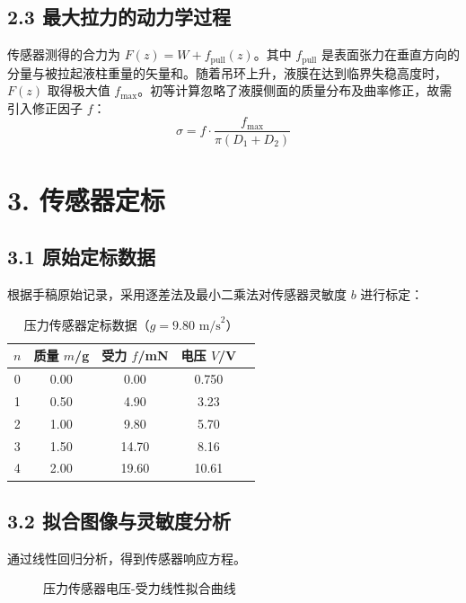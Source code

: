 \documentclass[twocolumn, 10pt, UTF8]{ctexart}
\begin{document}
	\subsection{2.3 最大拉力的动力学过程}
	传感器测得的合力为 $F(z) = W + f_{\text{pull}}(z)$。其中 $f_{\text{pull}}$ 是表面张力在垂直方向的分量与被拉起液柱重量的矢量和。随着吊环上升，液膜在达到临界失稳高度时，$F(z)$ 取得极大值 $f_{\max}$。初等计算忽略了液膜侧面的质量分布及曲率修正，故需引入修正因子 $f$：
	\begin{equation}
		\sigma = f \cdot \frac{f_{\max}}{\pi(D_1 + D_2)}
	\end{equation}
	
	\section{3. 传感器定标}
	
	\subsection{3.1 原始定标数据}
	根据手稿原始记录，采用逐差法及最小二乘法对传感器灵敏度 $b$ 进行标定：
	\begin{table}[htbp]
		\centering
		\caption{压力传感器定标数据（$g=9.80\text{ m/s}^2$）}
		\small
		\begin{tabular}{ccccc}
			\toprule
			$n$ & 质量 $m$/g & 受力 $f$/mN & 电压 $V$/V \\
			\midrule
			0 & 0.00 & 0.00 & 0.750 \\
			1 & 0.50 & 4.90 & 3.23 \\
			2 & 1.00 & 9.80 & 5.70 \\
			3 & 1.50 & 14.70 & 8.16 \\
			4 & 2.00 & 19.60 & 10.61 \\
			\bottomrule
		\end{tabular}
	\end{table}
	
	\subsection{3.2 拟合图像与灵敏度分析}
	通过线性回归分析，得到传感器响应方程。
	\begin{figure}[htbp]
		\centering
		\caption{压力传感器电压-受力线性拟合曲线}
	\end{figure}
	
\end{document}
